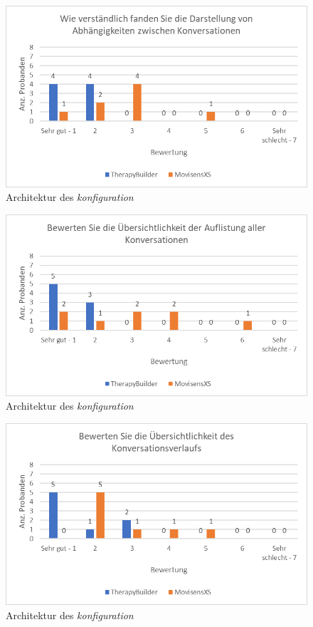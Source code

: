 \begin{figure}[!h]
\centering
\includegraphics[width=1\textwidth]{pictures/diagramme/konversationenabhaeng}
\caption{Architektur des \emph{konfiguration}}
\label{konversationenabhaeng}
\end{figure}

\begin{figure}[!h]
\centering
\includegraphics[width=1\textwidth]{pictures/diagramme/konversationenuebersicht}
\caption{Architektur des \emph{konfiguration}}
\label{konversationenuebersicht}
\end{figure}

\begin{figure}[!h]
\centering
\includegraphics[width=1\textwidth]{pictures/diagramme/konversationverlfueber}
\caption{Architektur des \emph{konfiguration}}
\label{konversationverlfueber}
\end{figure}




